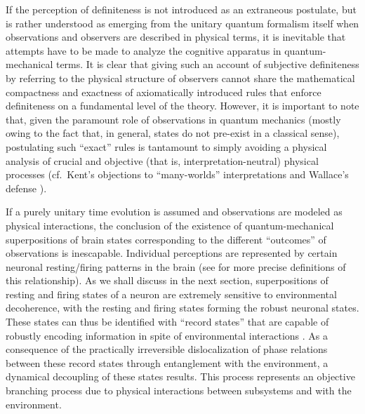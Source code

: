 \documentclass[12pt,aps,floatfix,amsmath,amssymb,showpacs,nofootinbib]{revtex4-2}
\begin{document}
If the perception of definiteness is not introduced as an extraneous
postulate, but is rather understood as emerging from the unitary
quantum formalism itself when observations and observers are described
in physical terms, it is inevitable that attempts have to be made to
analyze the cognitive apparatus in quantum-mechanical terms.  It is
clear that giving such an account of subjective definiteness by
referring to the physical structure of observers cannot share the
mathematical compactness and exactness of axiomatically introduced
rules that enforce definiteness on a fundamental level of the theory.
However, it is important to note that, given the paramount role of
observations in quantum mechanics (mostly owing to the fact that, in
general, states do not pre-exist in a classical sense), postulating
such ``exact'' rules is tantamount to simply avoiding a physical
analysis of crucial and objective (that is, interpretation-neutral)
physical processes (cf.\ Kent's objections to ``many-worlds''
interpretations \cite{Kent:1990:nm} and Wallace's defense
\cite{Wallace:2003:iz}).

If a purely unitary time evolution is assumed and observations are
modeled as physical interactions, the conclusion of the existence of
quantum-mechanical superpositions of brain states corresponding to the
different ``outcomes'' of observations is inescapable. Individual
perceptions are represented by certain neuronal resting/firing
patterns in the brain (see \cite{Donald:1995:lk,Donald:2002:um}
for more precise definitions of this relationship).  As we shall
discuss in the next section, superpositions of resting and firing
states of a neuron are extremely sensitive to environmental
decoherence, with the resting and firing states forming the robust
neuronal states. These states can thus be identified with ``record
states'' that are capable of robustly encoding information in spite of
environmental interactions \cite{Zurek:1998:re,Zurek:2004:yb}. As a
consequence of the practically irreversible dislocalization of phase
relations between these record states through entanglement with the
environment, a dynamical decoupling of these states results.  This
process represents an objective branching process due to physical
interactions between subsystems and with the environment.
\end{document}
